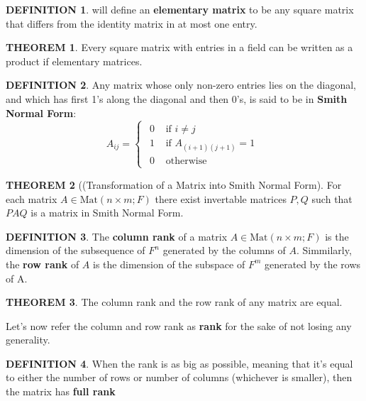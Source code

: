 \documentclass[10pt]{article}
\theoremstyle{definition}
\newtheorem{definition}{DEFINITION}[subsection]
\newtheorem{theorem}{THEOREM}[subsection]
\newcommand{\Mat}{\text{Mat}}
\begin{document}
\begin{definition}
    will define an \textbf{elementary matrix} to be any square matrix that differs from the identity matrix in at most one entry.
\end{definition}

\begin{theorem}
    Every square matrix with entries in a field can be written as a product if elementary matrices.
\end{theorem}

\begin{definition}
    Any matrix whose only non-zero entries lies on the diagonal, and which has first 1's along the diagonal and then 0's, is said to be in \textbf{Smith Normal Form}:
    \[A_{ij} = \begin{cases}\begin{split}
        0 &\text{ if } i \neq j\\
        1 &\text{ if } A_{(i+1)(j+1)} = 1\\
        0 &\text{ otherwise}
    \end{split}\end{cases}\]
\end{definition}

\begin{theorem}[(Transformation of a Matrix into Smith Normal Form]
    For each matrix $A \in \Mat(n\times m;F)$ there exist invertable matrices $P,Q$ such that $PAQ$ is a matrix in Smith Normal Form.
\end{theorem}

\begin{definition}
    The \textbf{column rank} of a matrix $A \in \Mat(n\times m;F)$ is the dimension of the subsequence of $F^n$ generated by the columns of $A$. Simmilarly, the \textbf{row rank} of $A$ is the dimension of the subspace of $F^m$ generated by the rows of A.
\end{definition}

\begin{theorem}
    The column rank and the row rank of any matrix are equal.
\end{theorem}

Let's now refer the column and row rank as \textbf{rank} for the sake of not losing any generality.

\begin{definition}
    When the rank is as big as possible, meaning that it's equal to either the number of rows or number of columns (whichever is smaller), then the matrix has \textbf{full rank}
\end{definition}
\end{document}
